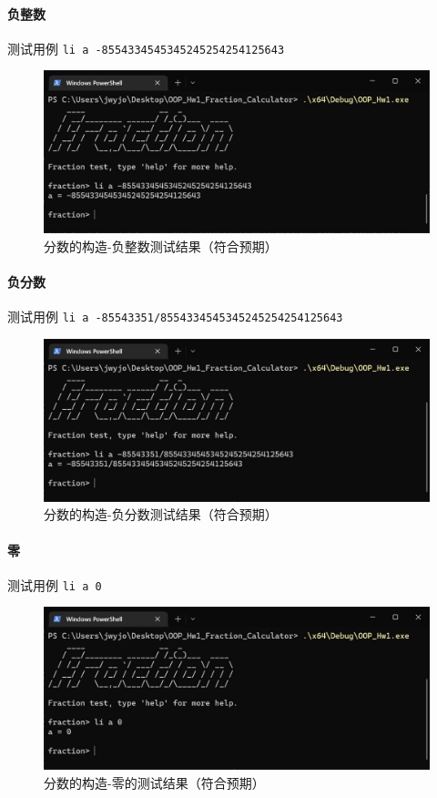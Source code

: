 \documentclass[cn,black,12pt,normal]{elegantnote}
\begin{document}
\paragraph{负整数} 测试用例 \lstinline{li a -8554334545345245254254125643}
\begin{figure}[H]
    \centering
    \includegraphics[width=.8\textwidth]{imgs/test_construct_negative_int.jpg}
    \caption{分数的构造-负整数测试结果（符合预期）}
\end{figure}

\paragraph{负分数} 测试用例 \lstinline{li a -85543351/8554334545345245254254125643}
\begin{figure}[H]
    \centering
    \includegraphics[width=.8\textwidth]{imgs/test_construct_negative_frac.jpg}
    \caption{分数的构造-负分数测试结果（符合预期）}
\end{figure}

\paragraph{零} 测试用例 \lstinline{li a 0}
\begin{figure}[H]
    \centering
    \includegraphics[width=.8\textwidth]{imgs/test_construct_zero.jpg}
    \caption{分数的构造-零的测试结果（符合预期）}
\end{figure}
\end{document}
